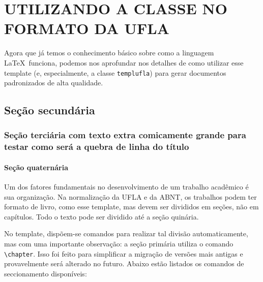 \chapter{\MakeUppercase{Utilizando a Classe no Formato da UFLA}}\label{sec:template}

Agora que já temos o conhecimento básico sobre como a linguagem \LaTeX\ funciona, podemos nos aprofundar nos detalhes de como utilizar esse template (e, especialmente, a classe \texttt{templufla}) para gerar documentos padronizados de alta qualidade.

\section{Seção secundária}\label{sec2:secoes}
\subsection{Seção terciária com texto extra comicamente grande para testar como será a quebra de linha do título}\label{sec3:teste}
\subsubsection{Seção quaternária}\label{sec4:teste}
\label{sec5:teste}

Um dos fatores fundamentais no desenvolvimento de um trabalho acadêmico é sua organização. Na normalização da UFLA e da ABNT, os trabalhos podem ter formato de livro, como esse template, mas devem ser divididos em seções, não em capítulos. Todo o texto pode ser dividido até a seção quinária.

No template, dispõem-se comandos para realizar tal divisão automaticamente, mas com uma importante observação: a seção primária utiliza o comando \verb|\chapter|. Isso foi feito para simplificar a migração de versões mais antigas e provavelmente será alterado no futuro. Abaixo estão listados os comandos de seccionamento disponíveis: 

